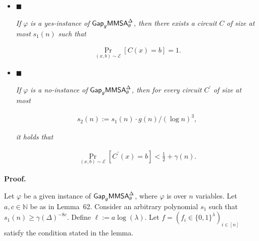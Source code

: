 \documentclass[10pt,a4paper]{article}
\begin{document}
\begin{itemize}


\item[] 
$\blacksquare$ 


\emph{If }$\varphi$\emph{ is a yes-instance of }${\sf Gap}_{g}{\mathsf{MMSA}}^{\Delta}_{\theta}$\emph{, then there exists a circuit }$C$\emph{ of size at most }$s_{1}(n)$\emph{ such that}\par


\[\begin{gathered}
\Pr_{(x,b)\sim\mathcal{E}}[C(x)=b]=1.
\end{gathered}\]





\item[] 
$\blacksquare$ 


\emph{If }$\varphi$\emph{ is a no-instance of }${\sf Gap}_{g}{\mathsf{MMSA}}^{\Delta}_{\theta}$\emph{, then for every circuit }$C^{\prime}$\emph{ of size at most}\par


\[\begin{gathered}
s_{2}(n):=s_{1}(n)\cdot g(n)/(\log n)^{3},
\end{gathered}\]


\emph{it holds that}\par


\[\begin{gathered}
\Pr_{(x,b)\sim\mathcal{E}}[C^{\prime}(x)=b]<\frac{1}{2}+\gamma(n).
\end{gathered}\]





\end{itemize}






\par\medskip\noindent\textbf{Proof.}\par




Let $\varphi$ be a given instance of ${\sf Gap}_{g}{\mathsf{MMSA}}^{\Delta}_{\theta}$, where $\varphi$ is over $n$ variables. Let $a,c\in\mathbb{N}$ be as in Lemma 62. Consider an arbitrary polynomial $s_{1}$ such that $s_{1}(n)\geq\gamma(\Delta)^{-8c}$. Define $\ell:=a\log(\lambda)$. Let $f=(f_{i}\in\{0,1\}^{\lambda})_{i\in[n]}$ satisfy the condition stated in the lemma.\par
\end{document}
